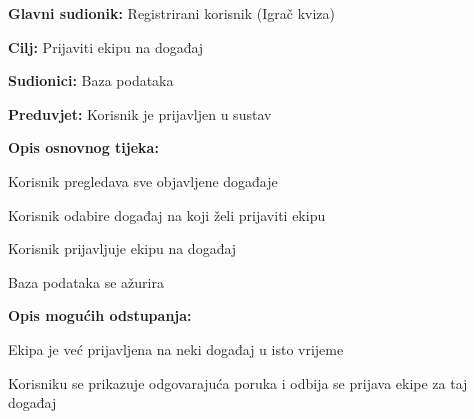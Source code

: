 				
				\noindent {}
				\begin{packed_item}
					
					\item \textbf{Glavni sudionik:} Registrirani korisnik (Igrač kviza)
					\item  \textbf{Cilj:} Prijaviti ekipu na događaj
					\item  \textbf{Sudionici:} Baza podataka
					\item  \textbf{Preduvjet:} Korisnik je prijavljen u sustav
					\item  \textbf{Opis osnovnog tijeka:}
					
					\item[] \begin{packed_enum}
						
						\item Korisnik pregledava sve objavljene događaje
						\item Korisnik odabire događaj na koji želi prijaviti ekipu
						\item Korisnik prijavljuje ekipu na događaj
						\item Baza podataka se ažurira
					\end{packed_enum}
					
					\item  \textbf{Opis mogućih odstupanja:}
					
					\item[] \begin{packed_item}
						
						\item[2.a] Ekipa je već prijavljena na neki događaj u isto vrijeme
						\item[] \begin{packed_enum}
							
							\item Korisniku se prikazuje odgovarajuća poruka i odbija se prijava ekipe za taj događaj
							
						\end{packed_enum}
						
					\end{packed_item}
					
				\end{packed_item}
				
